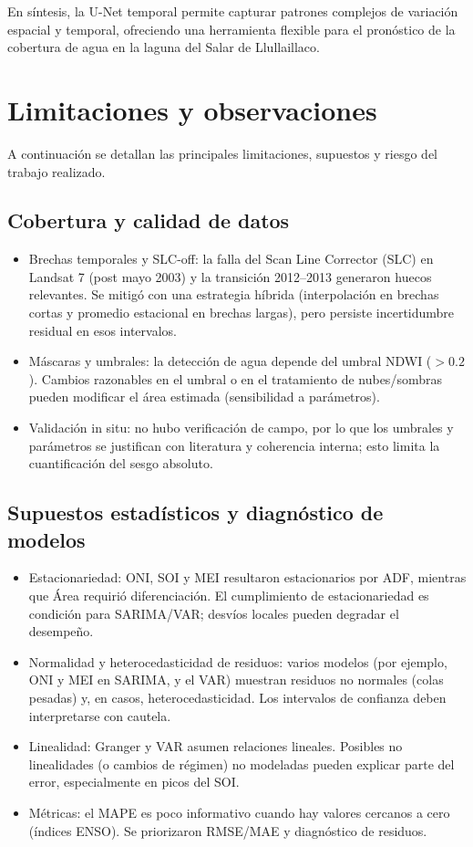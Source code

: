 En síntesis, la U-Net temporal permite capturar patrones complejos de variación espacial y temporal, ofreciendo una herramienta flexible para el pronóstico de la cobertura de agua en la laguna del Salar de Llullaillaco.


\section{Limitaciones y observaciones}
A continuación se detallan las principales limitaciones,  supuestos y riesgo del trabajo realizado.

\subsection{Cobertura y calidad de datos}
\begin{itemize}
    \item Brechas temporales y SLC-off: la falla del Scan Line Corrector (SLC) en Landsat 7 (post mayo 2003) y la transición 2012–2013 generaron huecos relevantes. Se mitigó con una estrategia híbrida (interpolación en brechas cortas y promedio estacional en brechas largas), pero persiste incertidumbre residual en esos intervalos.
    \item Máscaras y umbrales: la detección de agua depende del umbral NDWI ($>0.2$). Cambios razonables en el umbral o en el tratamiento de nubes/sombras pueden modificar el área estimada (sensibilidad a parámetros).
    \item Validación in situ: no hubo verificación de campo, por lo que los umbrales y parámetros se justifican con literatura y coherencia interna; esto limita la cuantificación del sesgo absoluto.
\end{itemize}

\subsection{Supuestos estadísticos y diagnóstico de modelos}
\begin{itemize}
    \item Estacionariedad: ONI, SOI y MEI resultaron estacionarios por ADF, mientras que Área requirió diferenciación. El cumplimiento de estacionariedad es condición para SARIMA/VAR; desvíos locales pueden degradar el desempeño.
    \item Normalidad y heterocedasticidad de residuos: varios modelos (por ejemplo, ONI y MEI en SARIMA, y el VAR) muestran residuos no normales (colas pesadas) y, en casos, heterocedasticidad. Los intervalos de confianza deben interpretarse con cautela.
    \item Linealidad: Granger y VAR asumen relaciones lineales. Posibles no linealidades (o cambios de régimen) no modeladas pueden explicar parte del error, especialmente en picos del SOI.
    \item Métricas: el MAPE es poco informativo cuando hay valores cercanos a cero (índices ENSO). Se priorizaron RMSE/MAE y diagnóstico de residuos.
\end{itemize}

